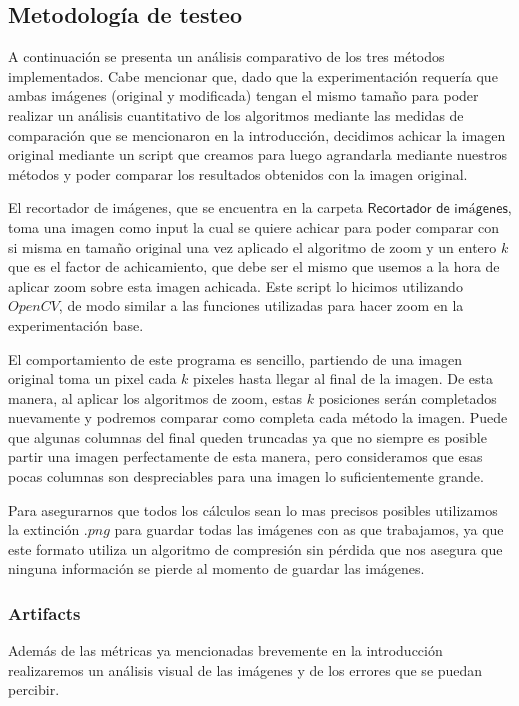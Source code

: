 \subsection{Metodología de testeo}
A continuación se presenta un análisis comparativo de los tres métodos implementados.
Cabe mencionar que, dado que la experimentación requería que ambas imágenes (original y modificada) tengan el mismo tamaño para poder realizar un análisis cuantitativo de los algoritmos mediante las medidas de comparación que se mencionaron en la introducción, decidimos achicar la imagen original mediante un script que creamos para luego agrandarla mediante nuestros métodos y poder comparar los resultados obtenidos con la imagen original.

El recortador de imágenes, que se encuentra en la carpeta $\textsf{Recortador de imágenes}$, toma una imagen como input la cual se quiere achicar para poder comparar con si misma en tamaño original una vez aplicado el algoritmo de zoom y un entero $k$ que es el factor de achicamiento, que debe ser el mismo que usemos a la hora de aplicar zoom sobre esta imagen achicada. Este script lo hicimos utilizando $OpenCV$, de modo similar a las funciones utilizadas para hacer zoom en la experimentación base.

El comportamiento de este programa es sencillo, partiendo de una imagen original toma un pixel cada $k$ pixeles hasta llegar al final de la imagen. De esta manera, al aplicar los algoritmos de zoom, estas $k$ posiciones serán completados nuevamente y podremos comparar como completa cada método la imagen. Puede que algunas columnas del final queden truncadas ya que no siempre es posible partir una imagen perfectamente de esta manera, pero consideramos que esas pocas columnas son despreciables para una imagen lo suficientemente grande. 

Para asegurarnos que todos los cálculos sean lo mas precisos posibles utilizamos la extinción $.png$ para guardar todas las imágenes con as que trabajamos, ya que este formato utiliza un algoritmo de compresión sin pérdida que nos asegura que ninguna información se pierde al momento de guardar las imágenes.

\subsubsection{Artifacts}

Además de las métricas ya mencionadas brevemente en la introducción realizaremos un análisis visual de las imágenes y de los errores que se puedan percibir.

